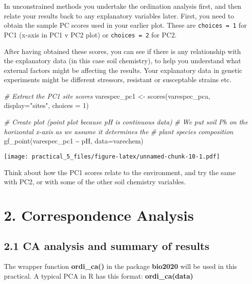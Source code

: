 \documentclass[
]{article}
\newenvironment{Shaded}{\begin{snugshade}}{\end{snugshade}}
\newcommand{\AttributeTok}[1]{\textcolor[rgb]{0.77,0.63,0.00}{#1}}
\newcommand{\CommentTok}[1]{\textcolor[rgb]{0.56,0.35,0.01}{\textit{#1}}}
\newcommand{\DecValTok}[1]{\textcolor[rgb]{0.00,0.00,0.81}{#1}}
\newcommand{\FunctionTok}[1]{\textcolor[rgb]{0.00,0.00,0.00}{#1}}
\newcommand{\NormalTok}[1]{#1}
\newcommand{\OtherTok}[1]{\textcolor[rgb]{0.56,0.35,0.01}{#1}}
\newcommand{\SpecialCharTok}[1]{\textcolor[rgb]{0.00,0.00,0.00}{#1}}
\newcommand{\StringTok}[1]{\textcolor[rgb]{0.31,0.60,0.02}{#1}}
\begin{document}
In unconstrained methods you undertake the ordination analysis first,
and then relate your results back to any explanatory variables later.
First, you need to obtain the sample PC scores used in your earlier
plot. These are \texttt{choices\ =\ 1} for PC1 (x-axis in PC1 v PC2
plot) or \texttt{choices\ =\ 2} for PC2.

After having obtained these scores, you can see if there is any
relationship with the explanatory data (in this case soil chemistry), to
help you understand what external factors might be affecting the
results. Your explanatory data in genetic experiments might be different
stressors, resistant or susceptable strains etc.

\begin{Shaded}
\begin{Highlighting}[]
\CommentTok{\# Extract the PC1 site scores}
\NormalTok{varespec\_pc1 }\OtherTok{\textless{}{-}} \FunctionTok{scores}\NormalTok{(varespec\_pca, }\AttributeTok{display=}\StringTok{"sites"}\NormalTok{, }\AttributeTok{choices =} \DecValTok{1}\NormalTok{)}

\CommentTok{\# Create plot (point plot because pH is continuous data)}
\CommentTok{\# We put soil Ph on the horizontal x{-}axis as we assume it determines the}
\CommentTok{\# plant species composition}
\FunctionTok{gf\_point}\NormalTok{(varespec\_pc1 }\SpecialCharTok{\textasciitilde{}}\NormalTok{ pH, }\AttributeTok{data=}\NormalTok{varechem) }
\end{Highlighting}
\end{Shaded}

\texttt{[image: practical\_5\_files/figure-latex/unnamed-chunk-10-1.pdf]}

Think about how the PC1 scores relate to the environment, and try the
same with PC2, or with some of the other soil chemistry variables.

\hypertarget{correspondence-analysis}{%
\section{2. Correspondence Analysis}\label{correspondence-analysis}}

\hypertarget{ca-analysis-and-summary-of-results}{%
\subsection{2.1 CA analysis and summary of
results}\label{ca-analysis-and-summary-of-results}}

The wrapper function \textbf{ordi\_ca()} in the package \textbf{bio2020}
will be used in this practical. A typical PCA in R has this format:
\textbf{ordi\_ca(data)}
\end{document}
